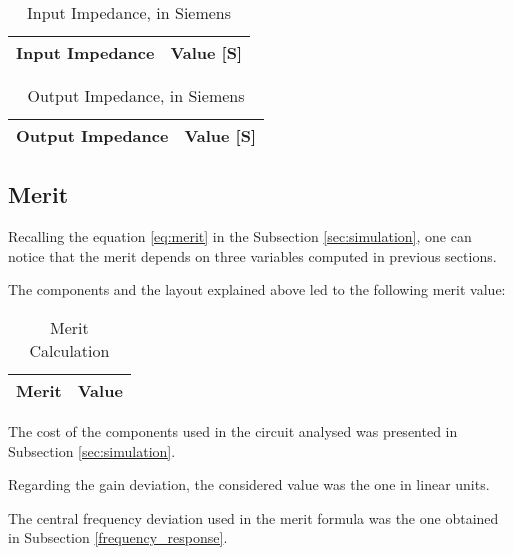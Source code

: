 \begin{table}[H]
  \centering
  \begin{tabular}{|l|r|}
    \hline    
    {\bf Input Impedance} & {\bf Value [S]} \\ \hline
    
  \end{tabular}
  \caption{Input Impedance, in Siemens}
  \label{tab:input_z}
\end{table}


\begin{table}[H]
  \centering
  \begin{tabular}{|l|r|}
    \hline    
    {\bf Output Impedance} & {\bf Value [S]} \\ \hline
    
  \end{tabular}
  \caption{Output Impedance, in Siemens}
  \label{tab:output_z}
\end{table}





\subsection{Merit}
\label{merit}

\par Recalling the equation \ref{eq:merit} in the Subsection \ref{sec:simulation}, one can notice that the merit depends on three variables computed in previous sections.
\par The components and the layout explained above led to the following merit value:

\begin{table}[H]
  \centering
  \begin{tabular}{ |l|r| } 
    \hline    
    {\bf Merit} & {\bf Value} \\ \hline
    
  \end{tabular}
  \caption{Merit Calculation}
  \label{tab:merit}
\end{table}

\par The cost of the components used in the circuit analysed was presented in Subsection \ref{sec:simulation}.
\par Regarding the gain deviation, the considered value was the one in linear units.
\par The central frequency deviation used in the merit formula was the one obtained in Subsection \ref{frequency_response}.
